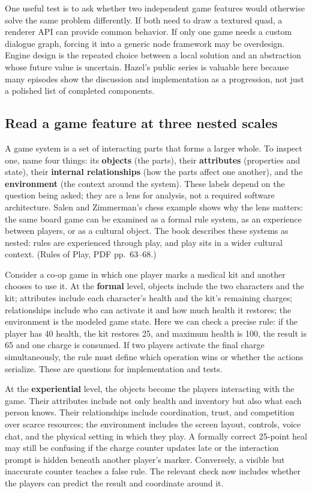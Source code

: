 One useful test is to ask whether two independent game features would otherwise solve the same problem differently. If both need to draw a textured quad, a renderer API can provide common behavior. If only one game needs a custom dialogue graph, forcing it into a generic node framework may be overdesign. Engine design is the repeated choice between a local solution and an abstraction whose future value is uncertain. Hazel's public series is valuable here because many episodes show the discussion and implementation as a progression, not just a polished list of completed components.

\subsection{Read a game feature at three nested scales}\label{05-engine-i-ch009-read-a-game-feature-at-three-nested-scales}

A game system is a set of interacting parts that forms a larger whole. To inspect one, name four things: its \textbf{objects} (the parts), their \textbf{attributes} (properties and state), their \textbf{internal relationships} (how the parts affect one another), and the \textbf{environment} (the context around the system). These labels depend on the question being asked; they are a lens for analysis, not a required software architecture. Salen and Zimmerman's chess example shows why the lens matters: the same board game can be examined as a formal rule system, as an experience between players, or as a cultural object. The book describes these systems as nested: rules are experienced through play, and play sits in a wider cultural context. (Rules of Play, PDF pp.~63--68.)

Consider a co-op game in which one player marks a medical kit and another chooses to use it. At the \textbf{formal} level, objects include the two characters and the kit; attributes include each character's health and the kit's remaining charges; relationships include who can activate it and how much health it restores; the environment is the modeled game state. Here we can check a precise rule: if the player has 40 health, the kit restores 25, and maximum health is 100, the result is 65 and one charge is consumed. If two players activate the final charge simultaneously, the rule must define which operation wins or whether the actions serialize. These are questions for implementation and tests.

At the \textbf{experiential} level, the objects become the players interacting with the game. Their attributes include not only health and inventory but also what each person knows. Their relationships include coordination, trust, and competition over scarce resources; the environment includes the screen layout, controls, voice chat, and the physical setting in which they play. A formally correct 25-point heal may still be confusing if the charge counter updates late or the interaction prompt is hidden beneath another player's marker. Conversely, a visible but inaccurate counter teaches a false rule. The relevant check now includes whether the players can predict the result and coordinate around it.

